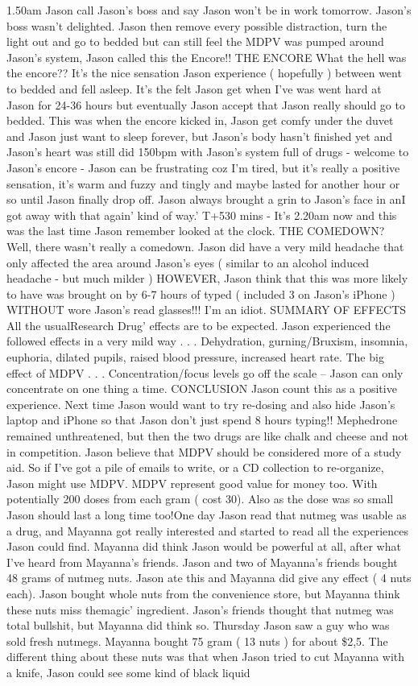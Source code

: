 \documentclass[12pt]{book}
\begin{document}
1.50am Jason call Jason's boss and say Jason won't be in work tomorrow. Jason's boss wasn't delighted. Jason then remove every possible distraction, turn the light out and go to bedded but can still feel the MDPV was pumped around Jason's system, Jason called this the Encore!! THE ENCORE What the hell was the encore?? It's the nice sensation Jason experience ( hopefully ) between went to bedded and fell asleep. It's the felt Jason get when I've was went hard at Jason for 24-36 hours but eventually Jason accept that Jason really should go to bedded. This was when the encore kicked in, Jason get comfy under the duvet and Jason just want to sleep forever, but Jason's body hasn't finished yet and Jason's heart was still did 150bpm with Jason's system full of drugs - welcome to Jason's encore - Jason can be frustrating coz I'm tired, but it's really a positive sensation, it's warm and fuzzy and tingly and maybe lasted for another hour or so until Jason finally drop off. Jason always brought a grin to Jason's face in anI got away with that again' kind of way.' T+530 mins - It's 2.20am now and this was the last time Jason remember looked at the clock. THE COMEDOWN? Well, there wasn't really a comedown. Jason did have a very mild headache that only affected the area around Jason's eyes ( similar to an alcohol induced headache - but much milder ) HOWEVER, Jason think that this was more likely to have was brought on by 6-7 hours of typed ( included 3 on Jason's iPhone ) WITHOUT wore Jason's read glasses!!! I'm an idiot. SUMMARY OF EFFECTS All the usualResearch Drug' effects are to be expected. Jason experienced the followed effects in a very mild way . . .  Dehydration, gurning/Bruxism, insomnia, euphoria, dilated pupils, raised blood pressure, increased heart rate. The big effect of MDPV . . .  Concentration/focus levels go off the scale -- Jason can only concentrate on one thing a time. CONCLUSION Jason count this as a positive experience. Next time Jason would want to try re-dosing and also hide Jason's laptop and iPhone so that Jason don't just spend 8 hours typing!! Mephedrone remained unthreatened, but then the two drugs are like chalk and cheese and not in competition. Jason believe that MDPV should be considered more of a study aid. So if I've got a pile of emails to write, or a CD collection to re-organize, Jason might use MDPV. MDPV represent good value for money too. With potentially 200 doses from each gram ( cost 30). Also as the dose was so small Jason should last a long time too!One day Jason read that nutmeg was usable as a drug, and Mayanna got really interested and started to read all the experiences Jason could find. Mayanna did think Jason would be powerful at all, after what I've heard from Mayanna's friends. Jason and two of Mayanna's friends bought 48 grams of nutmeg nuts. Jason ate this and Mayanna did give any effect ( 4 nuts each). Jason bought whole nuts from the convenience store, but Mayanna think these nuts miss themagic' ingredient. Jason's friends thought that nutmeg was total bullshit, but Mayanna did think so. Thursday Jason saw a guy who was sold fresh nutmegs. Mayanna bought 75 gram ( 13 nuts ) for about \$2,5. The different thing about these nuts was that when Jason tried to cut Mayanna with a knife, Jason could see some kind of black liquid 
\end{document}
